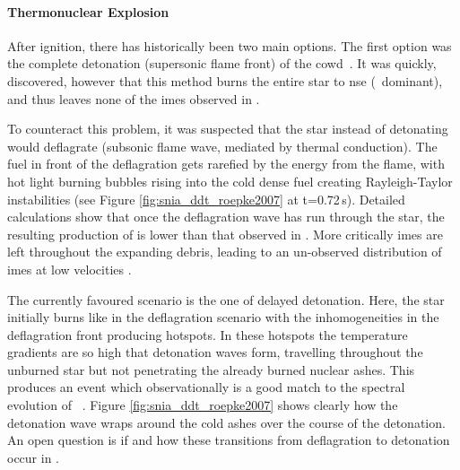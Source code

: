 \paragraph{Thermonuclear Explosion} After ignition, there has historically been two main options. The first option was the complete detonation (supersonic flame front) of the \gls{cowd}\ \citep{1969Ap&SS...5..180A}. It was quickly, discovered, however that this method burns the entire star to \gls{nse} (\Ni\ dominant),  and thus leaves none of the \glspl{ime} observed in \sneia. 

To counteract this problem, it was suspected that the star instead of detonating would deflagrate (subsonic flame wave, mediated by thermal conduction). The fuel in front of the deflagration gets rarefied by the energy from the flame, with hot light burning bubbles rising into the cold dense fuel creating Rayleigh-Taylor instabilities (see Figure \ref{fig:snia_ddt_roepke2007} at t=0.72\,s). 
Detailed calculations show that once the deflagration wave has run through the star, the resulting production of \Ni[56] is lower than that observed in \sneia. More critically \glspl{ime} are left throughout the expanding debris, leading to an un-observed distribution of \glspl{ime} at low velocities \citep{2007Sci...315..825M}.

The currently favoured scenario is the one of delayed detonation. Here, the star initially burns like in the deflagration scenario with the inhomogeneities in the deflagration front producing hotspots. In these hotspots the temperature gradients are so high that detonation waves form, travelling throughout the unburned star but not penetrating the already burned nuclear ashes. This produces an event which observationally is a good match to the spectral evolution of \sneia\ \citep[e.g.][]{2009Natur.460..869K}. Figure \ref{fig:snia_ddt_roepke2007} shows clearly how the detonation wave wraps around the cold ashes over the course of the detonation. An open question is if and how these transitions from deflagration to detonation occur in \sneia.


